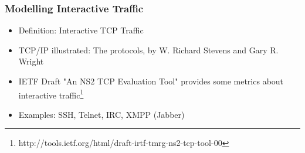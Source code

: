 \documentclass[xcolor=pdftex,dvipsnames,table]{beamer}
\begin{document}
\begin{frame}
\frametitle{Modelling Interactive Traffic}
\begin{itemize}
	\item Definition: Interactive TCP Traffic
	\bi
		\item TCP/IP illustrated: The protocols, by W. Richard Stevens and Gary R. Wright
		\item IETF Draft "An NS2 TCP Evaluation Tool" provides some metrics about interactive
		traffic\footnote{http://tools.ietf.org/html/draft-irtf-tmrg-ns2-tcp-tool-00}
		\item Examples: SSH, Telnet, IRC, XMPP (Jabber)
	\ei
\end{itemize}
\end{frame}
\end{document}
